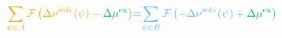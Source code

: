 \documentclass{article}
\begin{document}
\begin{equation}
\textcolor{orange}{\sum_{\psi\in A} \mathcal{F}\left( \Delta \nu^{\text{solv}}(\psi)-\textcolor{green}{\Delta\mu^{\text{ex}}} \right)} \textcolor{green}{=} \textcolor{cyan}{\sum_{\psi\in B} \mathcal{F}\left( -\Delta \nu^{\text{solv}}(\psi)+\textcolor{green}{\Delta\mu^{\text{ex}}} \right)}
\end{equation}
\end{document}
